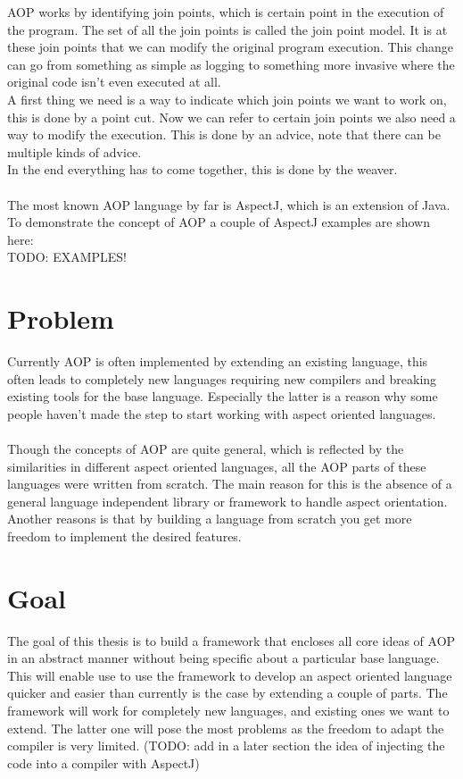 \documentclass[a4paper]{report}
\begin{document}
AOP works by identifying join points, which is certain point in the execution of the program. The set of all the join points is called the join point model. It is at these join points that we can modify the original program execution. This change can go from something as simple as logging to something more invasive where the original code isn't even executed at all.\\
A first thing we need is a way to indicate which join points we want to work on, this is done by a point cut. Now we can refer to certain join points we also need a way to modify the execution. This is done by an advice, note that there can be multiple kinds of advice.\\
In the end everything has to come together, this is done by the weaver.\\
\\
The most known AOP language by far is AspectJ, which is an extension of Java. To demonstrate the concept of AOP a couple of AspectJ examples are shown here:\\
TODO: EXAMPLES!\\

\section*{Problem}
Currently AOP is often implemented by extending an existing language, this often leads to completely new languages requiring new compilers and  breaking existing tools for the base language. Especially the latter is a reason why some people haven't made the step to start working with aspect oriented languages.\\
\\
Though the concepts of AOP are quite general, which is reflected by the similarities in different aspect oriented languages, all the AOP parts of these languages were written from scratch. The main reason for this is the absence of a general language independent library or framework to handle aspect orientation. Another reasons is that by building a language from scratch you get more freedom to implement the desired features.

\section*{Goal}
The goal of this thesis is to build a framework that encloses all core ideas of AOP in an abstract manner without being specific about a particular base language. This will enable use to use the framework to develop an aspect oriented language quicker and easier than currently is the case by extending a couple of parts. The framework will work for completely new languages, and existing ones we want to extend. The latter one will pose the most problems as the freedom to adapt the compiler is very limited. (TODO: add in a later section the idea of injecting the code into a compiler with AspectJ)
\end{document}
